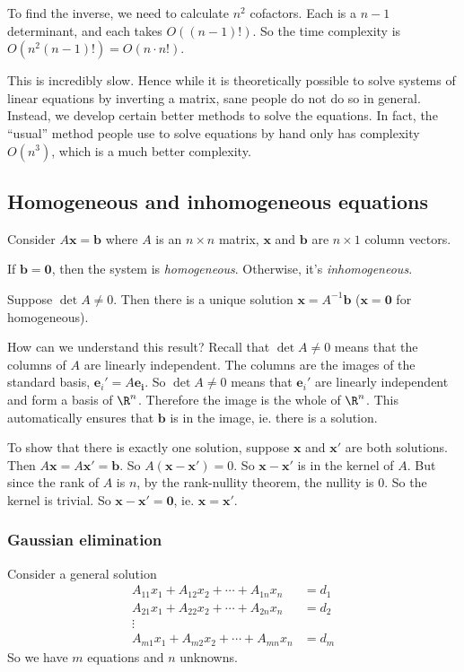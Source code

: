 \documentclass[a4paper]{article}
\begin{document}
To find the inverse, we need to calculate $n^2$ cofactors. Each is a $n -1$ determinant, and each takes $O((n - 1)!)$. So the time complexity is $O(n^2 (n - 1)!) = O(n\cdot n!)$.

This is incredibly slow. Hence while it is theoretically possible to solve systems of linear equations by inverting a matrix, sane people do not do so in general. Instead, we develop certain better methods to solve the equations. In fact, the ``usual'' method people use to solve equations by hand only has complexity $O(n^3)$, which is a much better complexity.

\subsection{Homogeneous and inhomogeneous equations}
Consider $A\mathbf{x} = \mathbf{b}$ where $A$ is an $n\times n$ matrix, $\mathbf{x}$ and $\mathbf{b}$ are $n\times 1$ column vectors.
\begin{defi}
  If $\mathbf{b} = \mathbf{0}$, then the system is \emph{homogeneous}. Otherwise, it's \emph{inhomogeneous}.
\end{defi}

Suppose $\det A\not= 0$. Then there is a unique solution $\mathbf{x} = A^{-1}\mathbf{b}$ ($\mathbf{x} = \mathbf{0}$ for homogeneous).

How can we understand this result? Recall that $\det A\not= 0$ means that the columns of $A$ are linearly independent. The columns are the images of the standard basis, $\mathbf{e}_i' = A\mathbf{e_i}$. So $\det A\not = 0$ means that $\mathbf{e}_i'$ are linearly independent and form a basis of $\R^n$. Therefore the image is the whole of $\R^n$. This automatically ensures that $\mathbf{b}$ is in the image, ie. there is a solution.

To show that there is exactly one solution, suppose $\mathbf{x}$ and $\mathbf{x}'$ are both solutions. Then $A\mathbf{x} = A\mathbf{x}' = \mathbf{b}$. So $A(\mathbf{x} - \mathbf{x}') = 0$. So $\mathbf{x} - \mathbf{x}'$ is in the kernel of $A$. But since the rank of $A$ is $n$, by the rank-nullity theorem, the nullity is $0$. So the kernel is trivial. So $\mathbf{x} - \mathbf{x}' = \mathbf{0}$, ie. $\mathbf{x} = \mathbf{x}'$.

\subsubsection{Gaussian elimination}
Consider a general solution
\begin{align*}
  A_{11}x_1 + A_{12}x_2 + \cdots + A_{1n}x_n &= d_1\\
  A_{21}x_1 + A_{22}x_2 + \cdots + A_{2n}x_n &= d_2\\
  \vdots&\\
  A_{m1}x_1 + A_{m2}x_2 + \cdots + A_{mn}x_n &= d_m
\end{align*}
So we have $m$ equations and $n$ unknowns.
\end{document}
